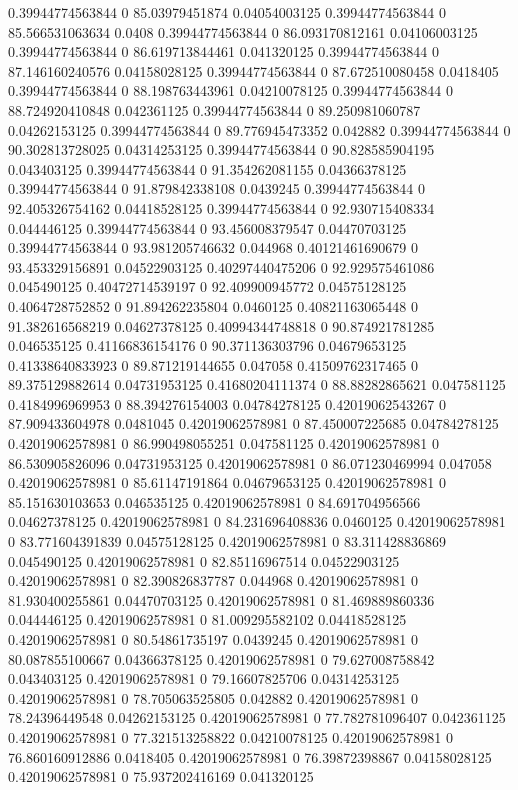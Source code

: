 0.39944774563844 0 85.03979451874 0.04054003125
0.39944774563844 0 85.566531063634 0.0408
0.39944774563844 0 86.093170812161 0.04106003125
0.39944774563844 0 86.619713844461 0.041320125
0.39944774563844 0 87.146160240576 0.04158028125
0.39944774563844 0 87.672510080458 0.0418405
0.39944774563844 0 88.198763443961 0.04210078125
0.39944774563844 0 88.724920410848 0.042361125
0.39944774563844 0 89.250981060787 0.04262153125
0.39944774563844 0 89.776945473352 0.042882
0.39944774563844 0 90.302813728025 0.04314253125
0.39944774563844 0 90.828585904195 0.043403125
0.39944774563844 0 91.354262081155 0.04366378125
0.39944774563844 0 91.879842338108 0.0439245
0.39944774563844 0 92.405326754162 0.04418528125
0.39944774563844 0 92.930715408334 0.044446125
0.39944774563844 0 93.456008379547 0.04470703125
0.39944774563844 0 93.981205746632 0.044968
0.40121461690679 0 93.453329156891 0.04522903125
0.40297440475206 0 92.929575461086 0.045490125
0.40472714539197 0 92.409900945772 0.04575128125
0.4064728752852 0 91.894262235804 0.0460125
0.40821163065448 0 91.382616568219 0.04627378125
0.40994344748818 0 90.874921781285 0.046535125
0.41166836154176 0 90.371136303796 0.04679653125
0.41338640833923 0 89.871219144655 0.047058
0.41509762317465 0 89.375129882614 0.04731953125
0.41680204111374 0 88.88282865621 0.047581125
0.4184996969953 0 88.394276154003 0.04784278125
0.42019062543267 0 87.909433604978 0.0481045
0.42019062578981 0 87.450007225685 0.04784278125
0.42019062578981 0 86.990498055251 0.047581125
0.42019062578981 0 86.530905826096 0.04731953125
0.42019062578981 0 86.071230469994 0.047058
0.42019062578981 0 85.61147191864 0.04679653125
0.42019062578981 0 85.151630103653 0.046535125
0.42019062578981 0 84.691704956566 0.04627378125
0.42019062578981 0 84.231696408836 0.0460125
0.42019062578981 0 83.771604391839 0.04575128125
0.42019062578981 0 83.311428836869 0.045490125
0.42019062578981 0 82.85116967514 0.04522903125
0.42019062578981 0 82.390826837787 0.044968
0.42019062578981 0 81.930400255861 0.04470703125
0.42019062578981 0 81.469889860336 0.044446125
0.42019062578981 0 81.009295582102 0.04418528125
0.42019062578981 0 80.54861735197 0.0439245
0.42019062578981 0 80.087855100667 0.04366378125
0.42019062578981 0 79.627008758842 0.043403125
0.42019062578981 0 79.16607825706 0.04314253125
0.42019062578981 0 78.705063525805 0.042882
0.42019062578981 0 78.24396449548 0.04262153125
0.42019062578981 0 77.782781096407 0.042361125
0.42019062578981 0 77.321513258822 0.04210078125
0.42019062578981 0 76.860160912886 0.0418405
0.42019062578981 0 76.39872398867 0.04158028125
0.42019062578981 0 75.937202416169 0.041320125
